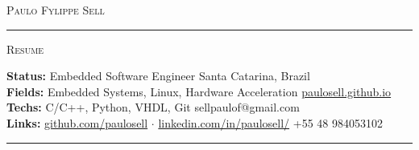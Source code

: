 \documentclass[10pt,A4]{article}
\newcommand{\metasection}[2]
{
\footnotesize{#2} \hspace*{\fill} \footnotesize{#1}\\[1pt]
}
\begin{document}
\pagestyle{fancy}	








\vspace{-8pt}
\begin{center}
	\HUGE \textsc{Paulo Fylippe Sell} \textcolor{sectcol}{\rule[-1mm]{1mm}{0.9cm}} \textsc{Resume}\\[2pt]
	
\end{center}



\vspace{6pt}


\metasection{Santa Catarina, Brazil}{\textbf{Status:} Embedded Software Engineer}
\metasection{\href{https://paulosell.github.io}{paulosell.github.io}}{\textbf{Fields:} Embedded Systems, Linux, Hardware Acceleration}
\metasection{sellpaulof@gmail.com}{\textbf{Techs:} C/C++, Python, VHDL, Git}
\metasection{+55 48 984053102}{\textbf{Links:} \href{https://github.com/paulosell}{github.com/paulosell} $\cdot$ \href{https://www.linkedin.com/in/paulosell/}{linkedin.com/in/paulosell/}} 
\vspace{-2pt}
\textcolor{softcol}{\hrule}
\vspace{6pt}

\normalsize
\end{document}
